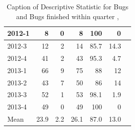 \documentclass[UKenglish]{ifimaster}  %
\begin{document}
\begin{appendices}
\begin{table}[!htbp]
\begin{adjustwidth}{-2.5cm}{}
{{\begin{tabular}{ | l | r | r | r | r | r | r | }
2012-1 & 8 & 0 & 8 & 100 & 0 \\ \hline
2012-3 & 12 & 2 & 14 & 85.7 & 14.3 \\ \hline
2012-4 & 41 & 2 & 43 & 95.3 & 4.7 \\ \hline
2013-1 & 66 & 9 & 75 & 88 & 12 \\ \hline
2013-2 & 43 & 7 & 50 & 86 & 14 \\ \hline
2013-3 & 52 & 1 & 53 & 98.1 & 1.9 \\ \hline
2013-4 & 49 & 0 & 49 & 100 & 0 \\ \hline
Mean & 23.9&2.2&26.1&87.0&13.0 \\ \hline
\end{tabular}
}
}
\end{adjustwidth}
\caption[Optional caption for list of figures]{Caption of Descriptive Statistic for Bugs and Bugs finished within quarter  , }
\label{DS:6:5} %
\end{table}


 
 
 

\end{appendices}
\end{document}
